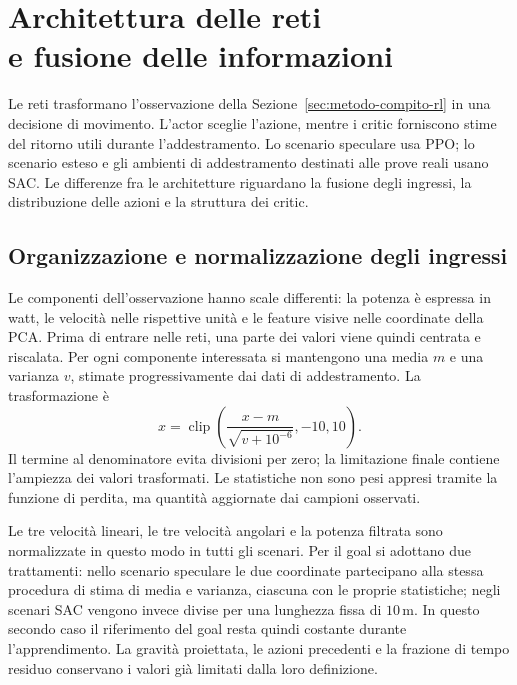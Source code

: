 \section[Architettura delle reti e fusione delle informazioni]{Architettura delle reti\\e fusione delle informazioni}
\label{sec:metodo-reti}

Le reti trasformano l'osservazione della Sezione~\ref{sec:metodo-compito-rl} in una decisione di movimento. L'actor sceglie l'azione, mentre i critic forniscono stime del ritorno utili durante l'addestramento. Lo scenario speculare usa PPO; lo scenario esteso e gli ambienti di addestramento destinati alle prove reali usano SAC. Le differenze fra le architetture riguardano la fusione degli ingressi, la distribuzione delle azioni e la struttura dei critic.

\subsection{Organizzazione e normalizzazione degli ingressi}

Le componenti dell'osservazione hanno scale differenti: la potenza è espressa in watt, le velocità nelle rispettive unità e le feature visive nelle coordinate della PCA. Prima di entrare nelle reti, una parte dei valori viene quindi centrata e riscalata. Per ogni componente interessata si mantengono una media $m$ e una varianza $v$, stimate progressivamente dai dati di addestramento. La trasformazione è
\begin{equation}
    \widehat x=\operatorname{clip}
       \left(\frac{x-m}{\sqrt{v+10^{-6}}},-10,10\right).
    \label{eq:metodo-normalizzazione-reti}
\end{equation}
Il termine al denominatore evita divisioni per zero; la limitazione finale contiene l'ampiezza dei valori trasformati. Le statistiche non sono pesi appresi tramite la funzione di perdita, ma quantità aggiornate dai campioni osservati.

Le tre velocità lineari, le tre velocità angolari e la potenza filtrata sono normalizzate in questo modo in tutti gli scenari. Per il goal si adottano due trattamenti: nello scenario speculare le due coordinate partecipano alla stessa procedura di stima di media e varianza, ciascuna con le proprie statistiche; negli scenari SAC vengono invece divise per una lunghezza fissa di $10\,\mathrm{m}$. In questo secondo caso il riferimento del goal resta quindi costante durante l'apprendimento. La gravità proiettata, le azioni precedenti e la frazione di tempo residuo conservano i valori già limitati dalla loro definizione.

